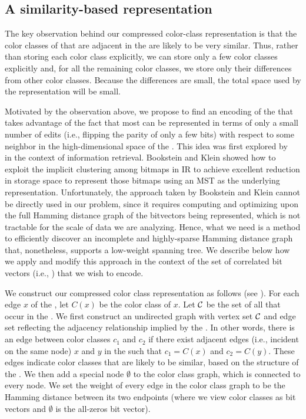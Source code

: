 \subsection{A similarity-based \cdbg representation}

The key observation behind our compressed color-class representation
is that the color classes of \kmers that are adjacent in the \dbg are
likely to be very similar.  Thus, rather than storing each color class
explicitly, we can store only a few color classes explicitly and, for
all the remaining color classes, we store only their differences from
other color classes.  Because the differences are small, the total space
used by the representation will be small.

Motivated by the observation above, we propose to find an encoding of the \ccs
that takes advantage of the fact that most \ccs can be represented in terms of
only a small number of edits (i.e., flipping the parity of only a few bits) with
respect to some neighbor in the high-dimensional space of the \ccs.
%
This idea was first explored by~\citet{Bookstein1991Compression} in the context
of information retrieval. Bookstein and Klein showed how to exploit the implicit
clustering among bitmaps in IR to achieve excellent reduction in storage space to
represent those bitmaps using an MST as the underlying representation.
Unfortunately, the approach taken by Bookstein and Klein cannot be directly used
in our problem, since it requires computing and optimizing upon the full Hamming
distance graph of the bitvectors being represented, which is not tractable for
the scale of data we are analyzing.  Hence, what we need is a method to efficiently
discover an incomplete and highly-sparse Hamming distance graph that, nonetheless,
supports a low-weight spanning tree.
%
We describe below how we apply and modify this approach in the context of the
set of correlated bit vectors (i.e., \ccs) that we wish to encode.

We construct our compressed color class representation as follows
(see ).
For each edge $x$ of the \dbg, let $C(x)$ be the color class of $x$.
Let $\mathcal{C}$ be the set of all \ccs that occur in the \dbg.  We first
construct an undirected graph with vertex set $\mathcal{C}$ and edge set reflecting the
adjacency relationship implied by the \dbg.  In other words, there is
an edge between color classes $c_1$ and $c_2$ if there exist adjacent
edges (i.e., incident on the same node) $x$ and $y$ in the \dbg such
that $c_1=C(x)$ and $c_2=C(y)$.  These edges indicate color classes
that are likely to be similar, based on the structure of the \dbg.  We
then add a special node $\emptyset$ to the color class graph, which is
connected to every node.  We set the weight of every edge in the color
class graph to be the Hamming distance between its two endpoints
(where we view color classes as bit vectors and $\emptyset$ is the
all-zeros bit vector).

